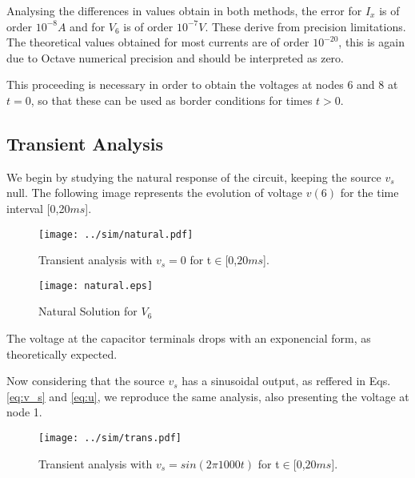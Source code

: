 \par Analysing the differences in values obtain in both methods, the error for $I_x$ is of order $10^{-8} A$ and for $V_6$ is of order $10^{-7} V$. These derive from precision limitations. The theoretical values obtained for most currents are of order $10^{-20}$, this is again due to Octave numerical precision and should be interpreted as zero.  

\par This proceeding is necessary in order to obtain the voltages at nodes 6 and 8 at $t=0$, so that these can be used as border conditions for times $t>0$. 

\subsection{Transient Analysis}

\par We begin by studying the natural response of the circuit, keeping the source $v_s$ null. The following image represents the evolution of voltage $v(6)$ for the time interval [0,20$ms$].

\begin{figure}[H]
  \centering
  \texttt{[image: ../sim/natural.pdf]}
  \caption{Transient analysis with $v_s =0$ for t$\in$[$0$,$20ms$].}
  \label{fig:sim_1}
\end{figure}


\begin{figure}[H]
  \centering
  \texttt{[image: natural.eps]}
  \caption{Natural Solution for $V_{6}$}
  \label{fig:OctaveNaturalSolution_2}
\end{figure}


The voltage at the capacitor terminals drops with an exponencial form, as theoretically expected.

\par Now considering that the source $v_s$ has a sinusoidal output, as reffered in Eqs. \ref{eq:v_s} and \ref{eq:u}, we reproduce the same analysis, also presenting the voltage at node 1.

\begin{figure}[H]
  \centering
  \texttt{[image: ../sim/trans.pdf]}
  \caption{Transient analysis with $v_s = sin(2\pi 1000 t)$ for t$\in$[$0$,$20ms$].}
  \label{fig:sim_2}
\end{figure}

